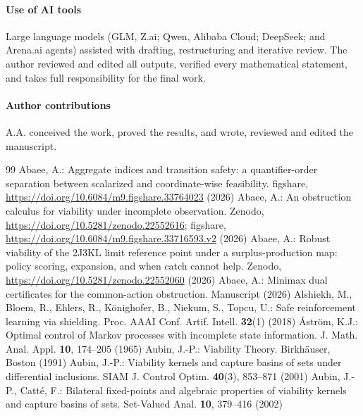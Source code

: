 \documentclass[11pt,a4paper]{article}
\theoremstyle{plain}
\theoremstyle{definition}
\theoremstyle{remark}
\begin{document}
\paragraph{Use of AI tools} Large language models (GLM, Z.ai; Qwen, Alibaba Cloud; DeepSeek; and Arena.ai agents) assisted with drafting, restructuring and iterative review. The author reviewed and edited all outputs, verified every mathematical statement, and takes full responsibility for the final work.
\paragraph{Author contributions} A.A. conceived the work, proved the results, and wrote, reviewed and edited the manuscript.

\renewcommand{\refname}{References}
\begin{thebibliography}{99}
\small
{} Abaee, A.: Aggregate indices and transition safety: a quantifier-order separation between scalarized and coordinate-wise feasibility. figshare, \url{https://doi.org/10.6084/m9.figshare.33764023} (2026)
 Abaee, A.: An obstruction calculus for viability under incomplete observation. Zenodo, \url{https://doi.org/10.5281/zenodo.22552616}; figshare, \url{https://doi.org/10.6084/m9.figshare.33716593.v2} (2026)
 Abaee, A.: Robust viability of the 2J3KL limit reference point under a surplus-production map: policy scoring, expansion, and when catch cannot help. Zenodo, \url{https://doi.org/10.5281/zenodo.22552060} (2026)
 Abaee, A.: Minimax dual certificates for the common-action obstruction. Manuscript (2026)
 Alshiekh, M., Bloem, R., Ehlers, R., K\"onighofer, B., Niekum, S., Topcu, U.: Safe reinforcement learning via shielding. Proc. AAAI Conf. Artif. Intell. \textbf{32}(1) (2018)
 \r{A}str\"om, K.J.: Optimal control of Markov processes with incomplete state information. J. Math. Anal. Appl. \textbf{10}, 174--205 (1965)
 Aubin, J.-P.: Viability Theory. Birkh\"auser, Boston (1991)
 Aubin, J.-P.: Viability kernels and capture basins of sets under differential inclusions. SIAM J. Control Optim. \textbf{40}(3), 853--871 (2001)
 Aubin, J.-P., Catt\'e, F.: Bilateral fixed-points and algebraic properties of viability kernels and capture basins of sets. Set-Valued Anal. \textbf{10}, 379--416 (2002)

\end{thebibliography}
\end{document}
